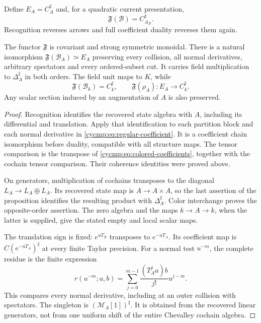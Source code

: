 Define $E_A=C_A^\sharp$ and, for a quadratic current presentation,
\[
 \mathfrak F(\mathcal B)=C_{A_{\mathcal B}}^\sharp.
\]
Recognition reverses arrows and full coefficient duality reverses
them again.

\begin{theorem}\label{cycmp:thm:regular-realization}
The functor $\mathfrak F$ is covariant and strong symmetric monoidal.
There is a natural isomorphism $\mathfrak F(\mathcal B_A)\simeq E_A$
preserving every collision, all normal derivatives, arbitrary spectators
and every ordered-subset cut. It carries field multiplication to
$\Delta_A^\sharp$ in both orders. The field unit maps to $K$, while
\[
 \mathfrak F(\mathcal B_k)=C_k^\sharp,
 \qquad \mathfrak F(\rho_A):E_A\longrightarrow C_k^\sharp.
\]
Any scalar section induced by an augmentation of $A$ is also preserved.
\end{theorem}

\begin{proof}
Recognition identifies the recovered state algebra with $A$, including
its differential and translation. Apply that identification to each
partition block and each normal derivative in
\eqref{cycmp:eq:regular-coefficient}. It is a coefficient chain
isomorphism before duality, compatible with all structure maps.
The tensor comparison is the transpose of
\eqref{cycmp:eq:colored-coefficients}, together with the cochain
tensor comparison. Their coherence identities were proved above.

On generators, multiplication of cochains transposes to the diagonal
$L_A\to L_A\oplus L_A$. Its recovered state map is
$A\to A\times A$, so the last assertion of the proposition identifies
the resulting product with $\Delta_A^\sharp$. Color interchange
proves the opposite-order assertion. The zero algebra and the maps
$k\to A\to k$, when the latter is supplied, give the stated empty
and local scalar maps.

The translation sign is fixed: $e^{uT_{\mathcal B}}$ transposes to
$e^{-uT_A}$. Its coefficient map is $C(e^{-uT_A})^\sharp$ at every
finite Taylor precision. For a normal test $u^{-m}$, the complete
residue is the finite expression
\begin{equation}\label{cycmp:eq:all-normal-regular}
 r(u^{-m};a,b)=\sum_{j=0}^{m-1}\frac{(T_A^ja)b}{j!}u^{j-m}.
\end{equation}
This compares every normal derivative, including at an outer collision
with spectators. The singleton is $(\mathscr M_A[1])^\sharp$.
It is obtained from the recovered linear generators, not from one
uniform shift of the entire Chevalley cochain algebra.
\end{proof}

